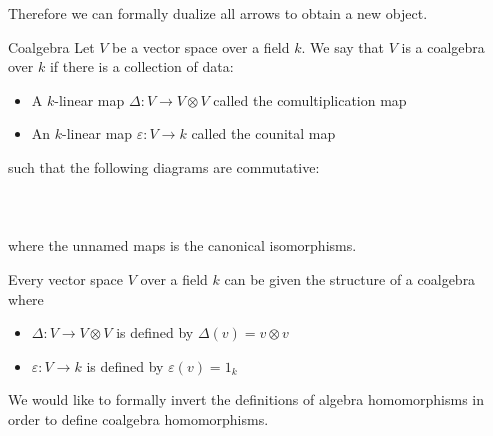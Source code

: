 \documentclass[a4paper]{article}
\begin{document}
Therefore we can formally dualize all arrows to obtain a new object. 

\begin{defn}{Coalgebra}{} Let $V$ be a vector space over a field $k$. We say that $V$ is a coalgebra over $k$ if there is a collection of data: 
\begin{itemize}
\item A $k$-linear map $\Delta:V\to V\otimes V$ called the comultiplication map
\item An $k$-linear map $\varepsilon:V\to k$ called the counital map
\end{itemize} 
such that the following diagrams are commutative: \\~\\
\\~\\
where the unnamed maps is the canonical isomorphisms. 
\end{defn}

\begin{lmm}{}{} Every vector space $V$ over a field $k$ can be given the structure of a coalgebra where 
\begin{itemize}
\item $\Delta:V\to V\otimes V$ is defined by $\Delta(v)=v\otimes v$
\item $\varepsilon:V\to k$ is defined by $\varepsilon(v)=1_k$
\end{itemize}

\end{lmm}

We would like to formally invert the definitions of algebra homomorphisms in order to define coalgebra homomorphisms. 
\end{document}
